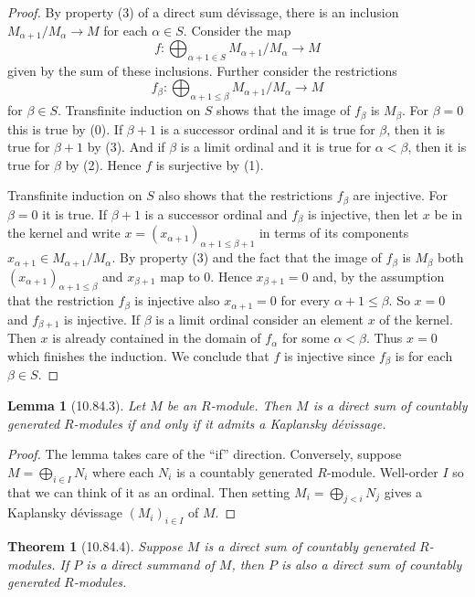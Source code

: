 \documentclass[UTF8,11pt]{ctexart}
\newtheorem*{theorem}{Theorem}
\newtheorem*{lemma}{Lemma}
\theoremstyle{definition}
\begin{document}
\begin{proof}
By property (3) of a direct sum d\'evissage, there is an inclusion $M_{\alpha+1}/M_\alpha\to M$ for each $\alpha\in S$. Consider the map
\[f:\bigoplus_{\alpha+1\in S}M_{\alpha+1}/M_\alpha\to M\]
given by the sum of these inclusions. Further consider the restrictions
\[f_\beta:\bigoplus_{\alpha+1\leq\beta}M_{\alpha+1}/M_\alpha\longrightarrow M\]
for $\beta\in S$. Transfinite induction on $S$ shows that the image of $f_\beta$ is $M_\beta$. For $\beta=0$ this is true by (0). If $\beta+1$ is a successor ordinal and it is true for $\beta$, then it is true for $\beta+1$ by (3). And if $\beta$ is a limit ordinal and it is true for $\alpha<\beta$, then it is true for $\beta$ by (2). Hence $f$ is surjective by (1).

Transfinite induction on $S$ also shows that the restrictions $f_\beta$ are injective. For $\beta=0$ it is true. If $\beta+1$ is a successor ordinal and $f_\beta$ is injective, then let $x$ be in the kernel and write $x=(x_{\alpha+1})_{\alpha+1\leq\beta+1}$ in terms of its components $x_{\alpha+1}\in M_{\alpha+1}/M_\alpha$. By property (3) and the fact that the image of $f_\beta$ is $M_\beta$ both $(x_{\alpha+1})_{\alpha+1\leq\beta}$ and $x_{\beta+1}$ map to $0$. Hence $x_{\beta+1}=0$ and, by the assumption that the restriction $f_\beta$ is injective also $x_{\alpha+1}=0$ for every $\alpha+1\leq\beta$. So $x=0$ and $f_{\beta+1}$ is injective. If $\beta$ is a limit ordinal consider an element $x$ of the kernel. Then $x$ is already contained in the domain of $f_\alpha$ for some $\alpha<\beta$. Thus $x=0$ which finishes the induction. We conclude that $f$ is injective since $f_\beta$ is for each $\beta\in S$.
\end{proof}
\begin{lemma}[10.84.3]
Let $M$ be an $R$-module. Then $M$ is a direct sum of countably generated $R$-modules if and only if it admits a Kaplansky d\'evissage.
\end{lemma}
\begin{proof}
The lemma takes care of the ``if'' direction. Conversely, suppose $M=\bigoplus_{i\in I}N_i$ where each $N_i$ is a countably generated $R$-module. Well-order $I$ so that we can think of it as an ordinal. Then setting $M_i=\bigoplus_{j<i}N_j$ gives a Kaplansky d\'evissage $(M_i)_{i\in I}$ of $M$.
\end{proof}
\begin{theorem}[10.84.4]
Suppose $M$ is a direct sum of countably generated $R$-modules. If $P$ is a direct summand of $M$, then $P$ is also a direct sum of countably generated $R$-modules.
\end{theorem}
\end{document}
